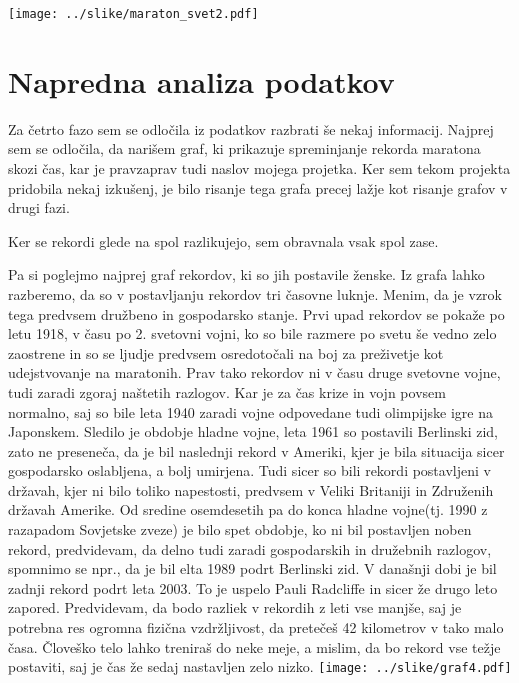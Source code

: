 \documentclass[11pt,a4paper]{article}
\begin{document}
\texttt{[image: ../slike/maraton\_svet2.pdf]}

\section{Napredna analiza podatkov}

Za četrto fazo sem se odločila iz podatkov razbrati še nekaj informacij. Najprej sem se odločila, da narišem graf, ki prikazuje spreminjanje rekorda maratona skozi čas, kar je pravzaprav tudi naslov mojega projetka. Ker sem tekom projekta pridobila nekaj izkušenj, je bilo risanje tega grafa precej lažje kot risanje grafov v drugi fazi.

Ker se rekordi glede na spol razlikujejo, sem obravnala vsak spol zase.

Pa si poglejmo najprej graf rekordov, ki so jih postavile ženske.
Iz grafa lahko razberemo, da so v postavljanju rekordov tri časovne luknje. Menim, da je vzrok tega predvsem družbeno in gospodarsko stanje. Prvi upad rekordov se pokaže po letu 1918, v času po 2. svetovni vojni, ko so bile razmere po svetu še vedno zelo zaostrene in so se ljudje predvsem osredotočali na boj za preživetje kot udejstvovanje na maratonih.
Prav tako rekordov ni v času druge svetovne vojne, tudi zaradi zgoraj naštetih razlogov. Kar je za čas krize in vojn povsem normalno, saj so bile leta 1940 zaradi vojne odpovedane tudi olimpijske igre na Japonskem.
Sledilo je obdobje hladne vojne, leta 1961 so postavili Berlinski zid, zato ne preseneča, da je bil naslednji rekord v Ameriki, kjer je bila situacija sicer gospodarsko oslabljena, a bolj umirjena. Tudi sicer so bili rekordi postavljeni v državah, kjer ni bilo toliko napestosti, predvsem v Veliki Britaniji in Združenih državah Amerike.
Od sredine osemdesetih pa do konca hladne vojne(tj. 1990 z razapadom Sovjetske zveze) je bilo spet obdobje, ko ni bil postavljen noben rekord, predvidevam, da delno tudi zaradi gospodarskih in družebnih razlogov, spomnimo se npr., da je bil elta 1989 podrt Berlinski zid.
V današnji dobi je bil zadnji rekord podrt leta 2003. To je uspelo Pauli Radcliffe in sicer že drugo leto zapored.
Predvidevam, da bodo razliek v rekordih z leti vse manjše, saj je potrebna res ogromna fizična vzdržljivost, da  pretečeš 42 kilometrov v tako malo časa. Človeško telo lahko treniraš do neke meje, a mislim, da bo rekord vse težje postaviti, saj je čas že sedaj nastavljen zelo nizko.
\texttt{[image: ../slike/graf4.pdf]}
\end{document}
